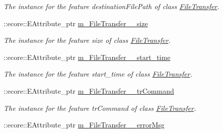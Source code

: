 \begin{DoxyCompactItemize}
\begin{DoxyCompactList}\small\item\em The instance for the feature destinationFilePath of class \hyperlink{classFMS__Data_1_1FileTransfer}{FileTransfer}. \item\end{DoxyCompactList}\item 
\hypertarget{classFMS__Data_1_1FMS__DataPackage_a68b5b21b4bf0857da6c3b4502b1292d5}{
::ecore::EAttribute\_\-ptr \hyperlink{classFMS__Data_1_1FMS__DataPackage_a68b5b21b4bf0857da6c3b4502b1292d5}{m\_\-FileTransfer\_\-\_\-size}}
\label{classFMS__Data_1_1FMS__DataPackage_a68b5b21b4bf0857da6c3b4502b1292d5}

\begin{DoxyCompactList}\small\item\em The instance for the feature size of class \hyperlink{classFMS__Data_1_1FileTransfer}{FileTransfer}. \item\end{DoxyCompactList}\item 
\hypertarget{classFMS__Data_1_1FMS__DataPackage_a3567d29ee30de2720d6b44c22df73fe8}{
::ecore::EAttribute\_\-ptr \hyperlink{classFMS__Data_1_1FMS__DataPackage_a3567d29ee30de2720d6b44c22df73fe8}{m\_\-FileTransfer\_\-\_\-start\_\-time}}
\label{classFMS__Data_1_1FMS__DataPackage_a3567d29ee30de2720d6b44c22df73fe8}

\begin{DoxyCompactList}\small\item\em The instance for the feature start\_\-time of class \hyperlink{classFMS__Data_1_1FileTransfer}{FileTransfer}. \item\end{DoxyCompactList}\item 
\hypertarget{classFMS__Data_1_1FMS__DataPackage_a13e6543940f78b8a086cf8cbc1aeb734}{
::ecore::EAttribute\_\-ptr \hyperlink{classFMS__Data_1_1FMS__DataPackage_a13e6543940f78b8a086cf8cbc1aeb734}{m\_\-FileTransfer\_\-\_\-trCommand}}
\label{classFMS__Data_1_1FMS__DataPackage_a13e6543940f78b8a086cf8cbc1aeb734}

\begin{DoxyCompactList}\small\item\em The instance for the feature trCommand of class \hyperlink{classFMS__Data_1_1FileTransfer}{FileTransfer}. \item\end{DoxyCompactList}\item 
\hypertarget{classFMS__Data_1_1FMS__DataPackage_a3614bc91b0a3c3a0188a4b26f89d96e0}{
::ecore::EAttribute\_\-ptr \hyperlink{classFMS__Data_1_1FMS__DataPackage_a3614bc91b0a3c3a0188a4b26f89d96e0}{m\_\-FileTransfer\_\-\_\-errorMsg}}
\label{classFMS__Data_1_1FMS__DataPackage_a3614bc91b0a3c3a0188a4b26f89d96e0}


\end{DoxyCompactItemize}
